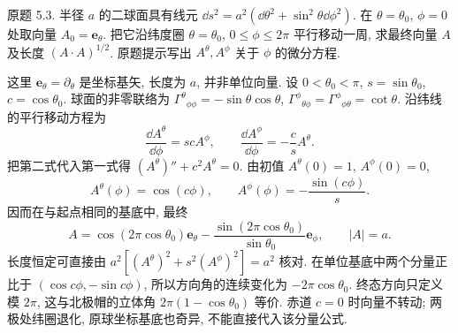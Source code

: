 \begin{exercise}
原题 5.3. 半径 $a$ 的二球面具有线元 $\dd s^2=a^2(\dd\theta^2+\sin^2\theta\dd\phi^2)$. 在 $\theta=\theta_0$, $\phi=0$ 处取向量 $A_0=\boldsymbol e_\theta$. 把它沿纬度圈 $\theta=\theta_0$, $0\le\phi\le2\pi$ 平行移动一周, 求最终向量 $A$ 及长度 $(A\cdot A)^{1/2}$. 原题提示写出 $A^\theta,A^\phi$ 关于 $\phi$ 的微分方程.
\end{exercise}
\begin{solution}
这里 $\boldsymbol e_\theta=\partial_\theta$ 是坐标基矢, 长度为 $a$, 并非单位向量. 设 $0<\theta_0<\pi$, $s=\sin\theta_0$, $c=\cos\theta_0$. 球面的非零联络为 $\Gamma^\theta{}_{\phi\phi}=-\sin\theta\cos\theta$, $\Gamma^\phi{}_{\theta\phi}=\Gamma^\phi{}_{\phi\theta}=\cot\theta$. 沿纬线的平行移动方程为
\[
\frac{\dd A^\theta}{\dd\phi}=scA^\phi,\qquad
\frac{\dd A^\phi}{\dd\phi}=-\frac csA^\theta.
\]
把第二式代入第一式得 $(A^\theta)''+c^2A^\theta=0$. 由初值 $A^\theta(0)=1$, $A^\phi(0)=0$,
\[
A^\theta(\phi)=\cos(c\phi),\qquad
A^\phi(\phi)=-\frac{\sin(c\phi)}s.
\]
因而在与起点相同的基底中, 最终
\[
A=\cos(2\pi\cos\theta_0)\boldsymbol e_\theta
-\frac{\sin(2\pi\cos\theta_0)}{\sin\theta_0}\boldsymbol e_\phi,
\qquad |A|=a.
\]
长度恒定可直接由 $a^2[(A^\theta)^2+s^2(A^\phi)^2]=a^2$ 核对. 在单位基底中两个分量正比于 $(\cos c\phi,-\sin c\phi)$, 所以方向角的连续变化为 $-2\pi\cos\theta_0$. 终态方向只定义模 $2\pi$, 这与北极帽的立体角 $2\pi(1-\cos\theta_0)$ 等价. 赤道 $c=0$ 时向量不转动; 两极处纬圈退化, 原球坐标基底也奇异, 不能直接代入该分量公式.
\end{solution}

